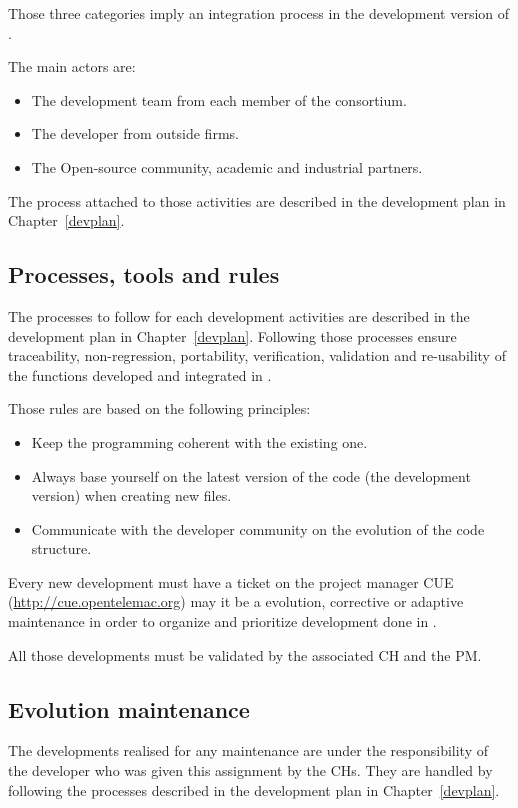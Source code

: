 Those three categories imply an integration process in the development version
of \telemacsystem.

The main actors are:
\begin{itemize}
\item The development team from each member of the consortium.
\item The developer from outside firms.
\item The Open-source community, academic and industrial partners.
\end{itemize}
The process attached to those activities are described in the development plan
in Chapter~\ref{devplan}.

\subsection{Processes, tools and rules}

The processes to follow for each development activities are described in the
development plan in Chapter~\ref{devplan}. Following those processes ensure
traceability, non-regression, portability, verification, validation and
re-usability of the functions developed and integrated in \telemacsystem.

Those rules are based on the following principles:
\begin{itemize}
\item Keep the programming coherent with the existing one.
\item Always base yourself on the latest version of the code (the development
  version) when creating new files.
\item Communicate with the developer community on the evolution of the code
  structure.
\end{itemize}

Every new development must have a ticket on the \telemacsystem{} project
manager CUE (\url{http://cue.opentelemac.org}) may it be a evolution,
corrective or adaptive maintenance in order to organize and prioritize
development done in \telemacsystem{}.

All those developments must be validated by the associated CH and the PM\@.

\subsection{Evolution maintenance}

The developments realised for any maintenance are under the responsibility of
the developer who was given this assignment by the CHs. They are handled by
following the processes described in the development plan in
Chapter~\ref{devplan}.

